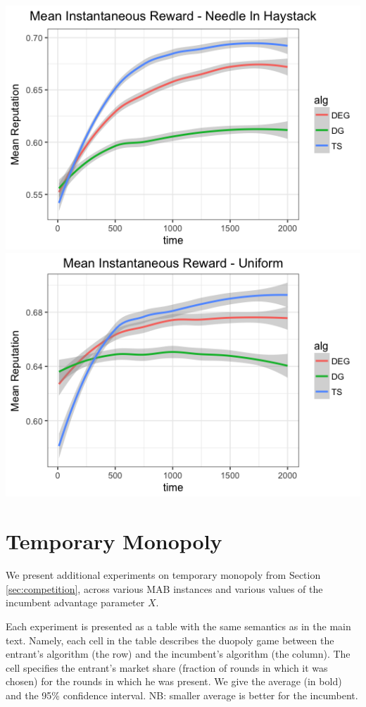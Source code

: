 \documentclass[../competing_bandits_with_appendix.tex]{subfiles}
\begin{document}
\begin{appendices}
\begin{center}
\includegraphics[scale=0.35]{appendix_figures/mean_inst_reward_nih}
\includegraphics[scale=0.35]{appendix_figures/mean_inst_reward_uniform}
\end{center}

\section{Temporary Monopoly}

We present additional experiments on temporary monopoly from Section \ref{sec:competition}, across various MAB instances and various values of the incumbent advantage parameter $X$.

Each experiment is presented as a table with the same semantics as in the main text. Namely, each cell in the table describes the duopoly game between the entrant's algorithm (the row) and the incumbent's algorithm (the column). The cell specifies the entrant's market share (fraction of rounds in which it was chosen) for the rounds in which he was present. We give the average (in bold) and the 95\% confidence interval. NB: smaller average is better for the incumbent.


\end{appendices}
\end{document}
